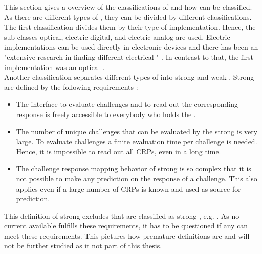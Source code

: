 This section gives a overview of the classifications of \pufs and how \apufs can be classified.
As there are different types of \pufs, they can be divided by different classifications.\\
The first classification divides them by their type of implementation.
Hence, the sub-classes optical, electric digital, and electric analog are used.
Electric implementations can be used directly in electronic devices and there has been an "extensive research in finding different electrical \pufs" \cite{Becker2015ThePUFs}.
In contrast to that, the first \puf implementation was an optical \puf.\\
Another classification separates different types of \pufs into strong and weak \pufs.
Strong \pufs are defined by the following requirements \cite{Ruhrmair2013PUFsEvaluations}:

\begin{itemize}
\item The interface to evaluate challenges and to read out the corresponding response is freely accessible to everybody who holds the \puf.
\item The number of unique challenges that can be evaluated by the strong \puf is very large.
To evaluate challenges a finite evaluation time per challenge is needed.
Hence, it is impossible to read out all \acp{CRP}, even in a long time.
\item The challenge response mapping behavior of strong \pufs is so complex that it is not possible to make any prediction on the response of a challenge. 
This also applies even if a large number of \acp{CRP} is known and used as source for prediction.
\end{itemize}

This definition of strong \pufs excludes \pufs that are classified as strong \puf, e.g. \xpufs \cite{Becker2015ThePUFs}.
As no current available \puf fulfills these requirements, it has to be questioned if any \puf can meet these requirements.
This pictures how premature \puf definitions are and will not be further studied as it not part of this thesis.


